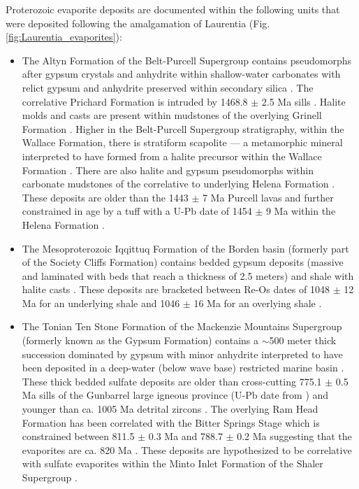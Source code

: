 \documentclass[twocolumn, switch]{article} %
\begin{document}
Proterozoic evaporite deposits are documented within the following units that were deposited following the amalgamation of Laurentia (Fig. \ref{fig:Laurentia_evaporites}): 
\begin{itemize}
\item The Altyn Formation of the Belt-Purcell Supergroup contains pseudomorphs after gypsum crystals and anhydrite within shallow-water carbonates with relict gypsum and anhydrite preserved within secondary silica \citep{White1984a}. The correlative Prichard Formation is intruded by 1468.8 $\pm$ 2.5 Ma sills \citep{Sears1998a}. Halite molds and casts are present within mudstones of the overlying Grinell Formation \citep{Pratt2019a}. Higher in the Belt-Purcell Supergroup stratigraphy, within the Wallace Formation, there is stratiform scapolite --- a metamorphic mineral interpreted to have formed from a halite precursor within the Wallace Formation \citep{Hietanen1967a}. There are also halite and gypsum pseudomorphs within carbonate mudstones of the correlative to underlying Helena Formation \citep{Pratt2001a,Winston2007a}.  These deposits are older than the 1443 $\pm$ 7 Ma Purcell lavas and further constrained in age by a tuff with a U-Pb date of 1454 $\pm$ 9 Ma within the Helena Formation \citep{Evans2000c}. 
\item The Mesoproterozoic Iqqittuq Formation of the Borden basin (formerly part of the Society Cliffs Formation) contains bedded gypsum deposits (massive and laminated with beds that reach a thickness of 2.5 meters) and shale with halite casts \citep{Kah2001a}.  These deposits are bracketed between Re-Os dates of 1048 $\pm$ 12 Ma for an underlying shale and 1046 $\pm$ 16 Ma for an overlying shale \citep{Gibson2018a}.
\item The Tonian Ten Stone Formation of the Mackenzie Mountains Supergroup (formerly known as the Gypsum Formation) contains a $\sim$500 meter thick succession dominated by gypsum with minor anhydrite interpreted to have been deposited in a deep-water (below wave base) restricted marine basin \citep{Turner2016a}. These thick bedded sulfate deposits are older than cross-cutting 775.1 $\pm$ 0.5 Ma sills of the Gunbarrel large igneous province (U-Pb date from \citealp{Milton2017a}) and younger than ca. 1005 Ma detrital zircons \citep{Turner2016a}. The overlying Ram Head Formation has been correlated with the Bitter Springs Stage which is constrained between 811.5 $\pm$ 0.3 Ma and 788.7 $\pm$ 0.2 Ma \citep{Macdonald2010a, Swanson-Hysell2015a} suggesting that the evaporites are ca. 820 Ma \citep{Turner2016a}. These deposits are hypothesized to be correlative with sulfate evaporites within the Minto Inlet Formation of the Shaler Supergroup \citep{Jones2010a, Turner2016a}.

\end{itemize}
\end{document}
